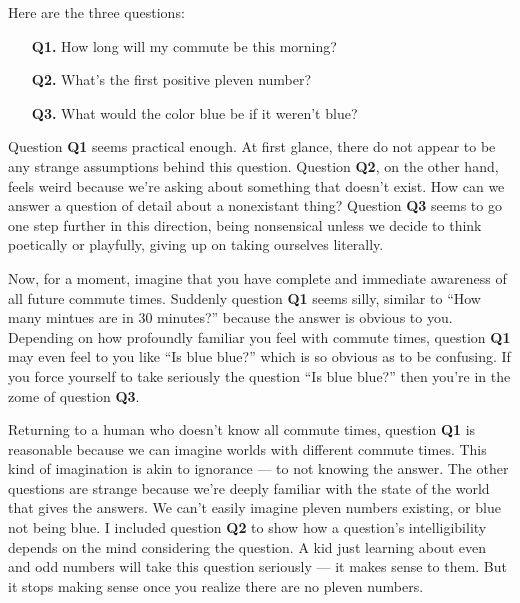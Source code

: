 \documentclass[11pt, oneside]{article}
\begin{document}
Here are the three questions:
\begin{enumerate}
    \item[{\bf Q1.}] How long will my commute be this morning?
    \item[{\bf Q2.}] What's the first positive pleven number?
    \item[{\bf Q3.}] What would the color blue be if it weren't blue?
\end{enumerate}
Question {\bf Q1} seems practical enough. At first glance, there do not appear
to be any strange assumptions behind this question.
Question {\bf Q2}, on the other hand, feels weird because we're asking about
something that doesn't exist. How can we answer a question of detail about a
nonexistant thing? Question {\bf Q3} seems to go one step further in this
direction,
being nonsensical unless we decide to think poetically or
playfully, giving up on taking ourselves literally.

Now, for a moment, imagine that you have complete and immediate awareness of all
future commute times. Suddenly question {\bf Q1} seems silly, similar to
``How many mintues are in 30 minutes?''
because the answer is obvious to you.
Depending on how profoundly
familiar you feel with commute times, question {\bf Q1} may even feel to you
like ``Is blue blue?'' which is so obvious as to be confusing. If you force
yourself to take seriously the question ``Is blue blue?'' then you're in the
zome of question {\bf Q3}.

Returning to a human who doesn't know all commute times,
question {\bf Q1} is
reasonable because we can imagine worlds with different commute
times. This kind of imagination is akin to ignorance --- to not knowing the
answer.
The other questions are strange because we're deeply familiar with the state of
the world that gives the answers. We can't easily imagine pleven numbers
existing, or blue not being blue.
I included question {\bf Q2} to show how a question's intelligibility
depends on the mind
considering the question. A kid just learning about even and odd numbers will
take this question seriously --- it makes sense to them. But it stops making
sense once you realize there are no pleven numbers.
\end{document}
